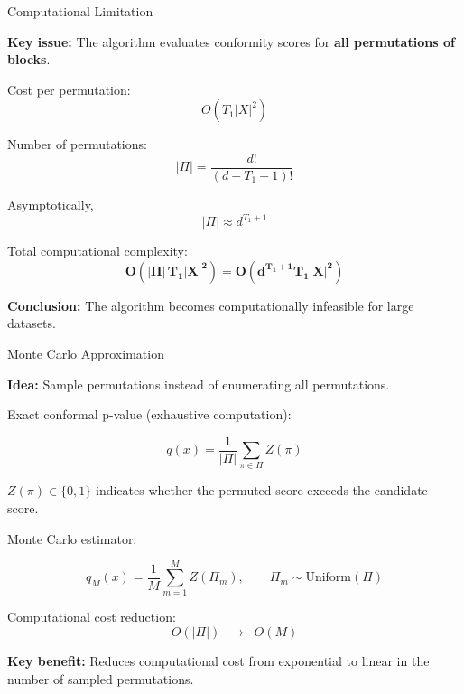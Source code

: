 \documentclass{beamer}					%
\begin{document}
\begin{frame}{Computational Limitation}

\textbf{Key issue:} The algorithm evaluates conformity scores for 
\textbf{all permutations of blocks}.

\vspace{0.4cm}

Cost per permutation:
\[
O(T_1 |X|^2)
\]

\vspace{0.3cm}

Number of permutations:
\[
|\Pi| = \frac{d!}{(d - T_1 - 1)!}
\]

Asymptotically,
\[
|\Pi| \approx d^{T_1+1}
\]

\vspace{0.3cm}

Total computational complexity:
\[
\mathbf{O(|\Pi|\,T_1|X|^2)}
=
\mathbf{O(d^{T_1+1}T_1|X|^2)}
\]

\vspace{0.4cm}

\textbf{Conclusion:} The algorithm becomes computationally infeasible for
large datasets.

\end{frame}

\begin{frame}{Monte Carlo Approximation}

\textbf{Idea:} Sample permutations instead of enumerating all permutations.

\vspace{0.2cm}

Exact conformal p-value (exhaustive computation):

\[
q(x) = \frac{1}{|\Pi|}\sum_{\pi \in \Pi} Z(\pi)
\]

\(Z(\pi)\in\{0,1\}\) indicates whether the permuted score exceeds the candidate score.

Monte Carlo estimator:

\[
\hat{q}_M(x) = \frac{1}{M}\sum_{m=1}^{M} Z(\Pi_m),
\qquad
\Pi_m \sim \text{Uniform}(\Pi)
\]

\vspace{0.1cm}

Computational cost reduction:
\[
O(|\Pi|)
\;\;\longrightarrow\;\;
O(M)
\]

\textbf{Key benefit:} Reduces computational cost from exponential to linear in the number of sampled permutations.

\end{frame}
\end{document}
